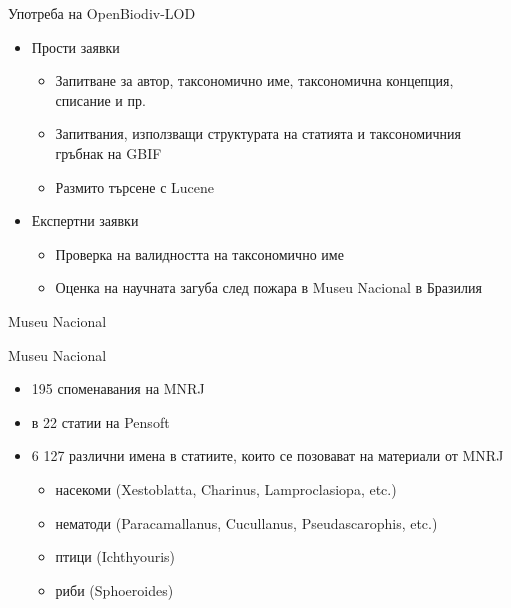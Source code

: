 \documentclass[bulgarian]{beamer}
\begin{document}
\begin{frame}{Употреба на OpenBiodiv-LOD}
\begin{itemize}
    \item Прости заявки
    \begin{itemize}
        \item Запитване за автор, таксономично име, таксономична концепция, списание и пр.
        \item Запитвания, използващи структурата на статията и таксономичния гръбнак на GBIF
        \item Размито търсене с Lucene
    \end{itemize}
    \item Експертни заявки
    \begin{itemize}
        \item Проверка на валидността на таксономично име
        \item Оценка на научната загуба след пожара в Museu Nacional в Бразилия
    \end{itemize}
\end{itemize}
\end{frame}


\begin{frame}{Museu Nacional}



\end{frame}

\begin{frame}{Museu Nacional}
\begin{itemize}
    \item 195 споменавания на MNRJ
    \item в 22 статии на Pensoft
    \item 6 127 различни имена в статиите, които се позовават на материали от MNRJ
    \begin{itemize}
     \item насекоми (Xestoblatta, Charinus, Lamproclasiopa, etc.)
    \item  нематоди (Paracamallanus, Cucullanus, Pseudascarophis, etc.)
    \item  птици (Ichthyouris)
    \item  риби (Sphoeroides)
    \end{itemize}
     
\end{itemize}

\end{frame}
\end{document}
